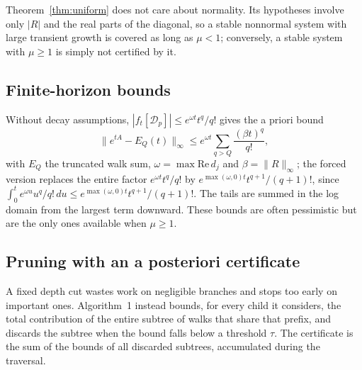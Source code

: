 \documentclass[aps,pra,superscriptaddress,floatfix,longbibliography,twocolumn]{revtex4-2}
\begin{document}
Theorem~\ref{thm:uniform} does not care about normality. Its hypotheses involve only $|R|$ and the real parts of the diagonal, so a stable nonnormal system with large transient growth is covered as long as $\mu<1$; conversely, a stable system with $\mu\ge1$ is simply not certified by it.

\subsection{Finite-horizon bounds}
Without decay assumptions, $|f_t[\mathcal{D}_p]|\le e^{\omega t}t^q/q!$ gives the a priori bound
\begin{equation}\label{eq:horizon}
\|e^{tA}-E_Q(t)\|_\infty\le e^{\omega t}\sum_{q>Q}\frac{(\beta t)^q}{q!},
\end{equation}
with $E_Q$ the truncated walk sum, $\omega=\max\mathrm{Re}\,d_j$ and $\beta=\|R\|_\infty$; the forced version replaces the entire factor $e^{\omega t}t^q/q!$ by $e^{\max(\omega,0)t}t^{q+1}/(q+1)!$, since $\int_0^t e^{\omega u}u^q/q!\,du\le e^{\max(\omega,0)t}t^{q+1}/(q+1)!$. The tails are summed in the log domain from the largest term downward. These bounds are often pessimistic but are the only ones available when $\mu\ge1$.

\subsection{Pruning with an a posteriori certificate}\label{sec:certificate}
A fixed depth cut wastes work on negligible branches and stops too early on important ones. Algorithm~1 instead bounds, for every child it considers, the total contribution of the entire subtree of walks that share that prefix, and discards the subtree when the bound falls below a threshold $\tau$. The certificate is the sum of the bounds of all discarded subtrees, accumulated during the traversal.
\end{document}
